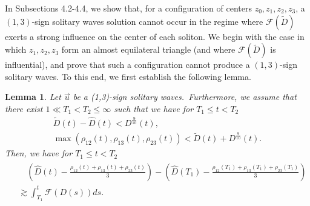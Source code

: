 \documentclass[reqno]{amsart}
\theoremstyle{plain}
\newtheorem{lemma}[theorem]{Lemma}
\theoremstyle{definition}
\newtheorem{remark}{Remark}[section]
\numberwithin{equation}{section}
\newcommand{\1}{\mathbbm{1}}
\begin{document}
In Subsections 4.2-4.4, we show that, for a configuration of centers $z_0,z_1,z_2,z_3$, a $(1,3)$-sign solitary waves solution cannot occur in the regime where $\mathcal{F}(\tilde{D})$ exerts a strong influence on the center of each soliton. We begin with the case in which $z_1,z_2,z_3$ form an almost equilateral triangle (and where $\mathcal{F}(\tilde{D})$ is influential), and prove that such a configuration cannot produce a $(1,3)$-sign solitary waves. To this end, we first establish the following lemma.
\begin{lemma}\label{henchousystem}
Let $\vec{u}$ be a (1,3)-sign solitary waves.\ Furthermore, we assume that there exist $1\ll T_1<T_2\leq \infty$ such that we have for $T_1\leq t<T_2$
\begin{align}
\tilde{D}(t)-\hat{D}(t)<D^{\frac{9}{10}}(t),\label{tilhatD}
\\
\max{(\rho_{12}(t),\rho_{13}(t),\rho_{23}(t))}<\tilde{D}(t)+D^{\frac{9}{10}}(t).\label{maxtilD}
\end{align}
Then, we have for $T_1\leq t<T_2$
\begin{align}\label{osidasi1}
\begin{aligned}
&\quad \left(\hat{D}(t)-\frac{\rho_{12}(t)+\rho_{13}(t)+\rho_{23}(t)}{3}\right)-\left(\hat{D}(T_1)-\frac{\rho_{12}(T_1)+\rho_{13}(T_1)+\rho_{23}(T_1)}{3}\right)
\\
&\gtrsim \int_{T_1}^{t} \mathcal{F}(D(s))ds.
\end{aligned}
\end{align}
\end{lemma} 
\end{document}
